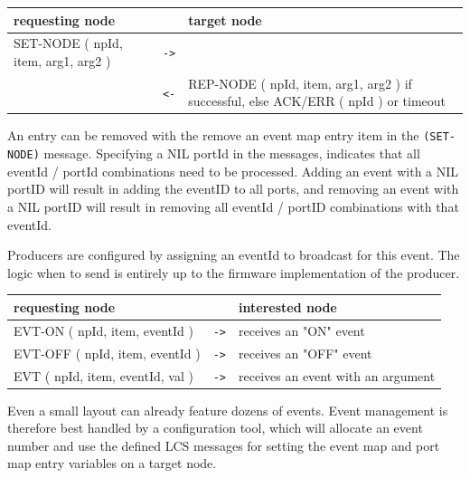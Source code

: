 \begin{table}[ht!]
    \begin{center}
        \begin{tabular}{|p{}| c |p{}|}
            \toprule
            \textbf{requesting node} & & \textbf{ target node} \\
            \midrule
            SET-NODE ( npId, item, arg1, arg2 ) & \texttt{->} &  \\
            \midrule
            & \texttt{<-} & REP-NODE ( npId, item, arg1, arg2 ) if successful, else ACK/ERR ( npId ) or timeout \\
            \bottomrule
        \end{tabular}
    \end{center}
\end{table}

An entry can be removed with the remove an event map entry item in the \texttt{(SET-NODE)} message. Specifying a NIL portId in the messages, indicates that all eventId / portId combinations need to be processed. Adding an event with a NIL portID will result in adding the eventID to all ports, and removing an event with a NIL portID will result in removing all eventId / portID combinations with that eventId.

Producers are configured by assigning an eventId to broadcast for this event. The logic when to send is entirely up to the firmware implementation of the producer.

\begin{table}[ht!]
    \begin{center}
        \begin{tabular}{|p{}| c |p{}|}
            \toprule
            \textbf{requesting node} & & \textbf{ interested node} \\
            \midrule
            EVT-ON ( npId, item, eventId ) & \texttt{->} & receives an "ON" event \\
            EVT-OFF ( npId, item, eventId ) & \texttt{->} & receives an "OFF" event \\
            \midrule
            EVT ( npId, item, eventId, val ) & \texttt{->} & receives an event with an argument \\
            \bottomrule
        \end{tabular}
    \end{center}
\end{table}

Even a small layout can already feature dozens of events. Event management is therefore best handled by a configuration tool, which will allocate an event number and use the defined LCS messages for setting the event map and port map entry variables on a target node.

